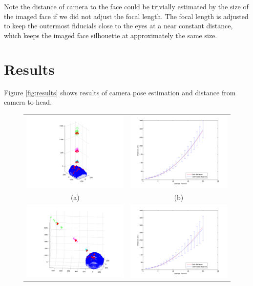 \documentclass[runningheads]{llncs}
\begin{document}
Note the distance of camera to the face could be trivially estimated by the size of the imaged face if we did not adjust the focal length. 
The focal length is adjusted to keep the outermost fiducials close to the eyes at a near constant distance, which keeps the imaged face silhouette at approximately the same size.

\section{Results}
Figure \ref{fig:results} shows results of camera pose estimation and distance from camera to head.  
\begin{figure}[ht]
\begin{tabular}{cc}
\includegraphics[width=.45\linewidth]{resources/figures/cameraloc_frontal.png} &
\includegraphics[width=.45\linewidth]{resources/figures/errorbar_frontal.png} \\
(a) & (b) \\
\includegraphics[width=.45\linewidth]{resources/figures/cameraloc_3q.png} &
\includegraphics[width=.45\linewidth]{resources/figures/errorbar_3q.png} \\

\end{tabular}
\end{figure}
\end{document}

